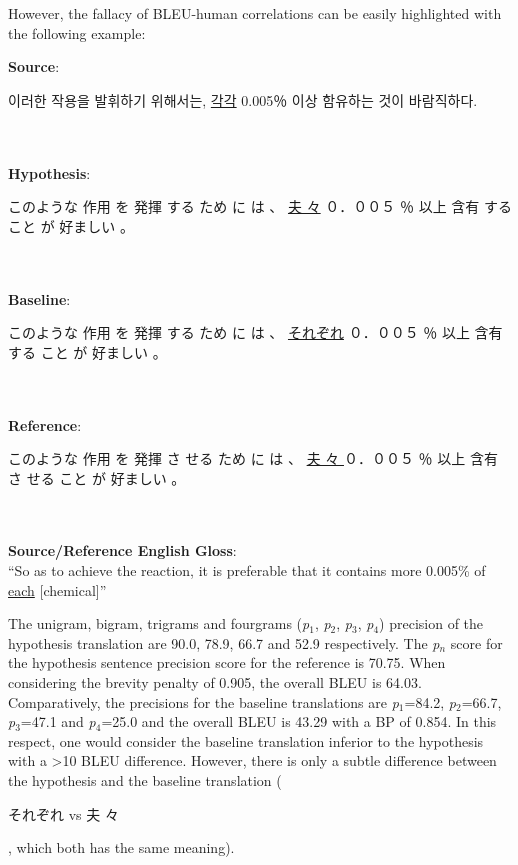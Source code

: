 However, the fallacy of BLEU-human correlations can be easily highlighted with the following example:

\newpage 
\noindent \textbf{Source}: \\
\begin{CJK*}{UTF8}{}\begin{korean}이러한 작용을 발휘하기 위해서는, \underline{각각} 0.005％ 이상 함유하는 것이 바람직하다. \end{korean}\end{CJK*}
\\ \\
\noindent \textbf{Hypothesis}:  \\
\begin{CJK*}{UTF8}{min}このような 作用 を 発揮 する ため に は 、 \underline{夫 々} ０．００５ ％ 以上 含有 する こと が 好ましい 。\end{CJK*}
\\ \\
\noindent \textbf{Baseline}:  \\
\begin{CJK*}{UTF8}{min}このような 作用 を 発揮 する ため に は 、 \underline{それぞれ} ０．００５ ％ 以上 含有 する こと が 好ましい 。\end{CJK*}
\\ \\
\noindent \textbf{Reference}: \\
\begin{CJK*}{UTF8}{min}このような 作用 を 発揮 さ せる ため に は 、 \underline{夫 々 } ０．００５ ％ 以上 含有 さ せる こと が 好ましい 。\end{CJK*}
\\ \\
\textbf{Source/Reference English Gloss}: \\
``So as to achieve the reaction, it is preferable that it contains more 0.005\% of \underline{each} [chemical]''
\vspace{5mm}

The unigram, bigram, trigrams and fourgrams (\emph{p$_1$}, \emph{p$_2$}, \emph{p$_3$}, \emph{p$_4$}) precision of the hypothesis translation are 90.0, 78.9, 66.7 and 52.9 respectively. The \emph{p$_n$} score for the hypothesis sentence precision score for the reference is 70.75. When considering the brevity penalty of 0.905, the overall BLEU is 64.03. Comparatively, the \ngram{} precisions for the baseline translations are \emph{p$_1$}=84.2, \emph{p$_2$}=66.7, \emph{p$_3$}=47.1 and \emph{p$_4$}=25.0 and the overall BLEU is 43.29 with a BP of 0.854. In this respect, one would consider the baseline translation inferior to the hypothesis with a \textgreater10 BLEU difference. However, there is only a subtle difference between the hypothesis and the baseline translation (\begin{CJK*}{UTF8}{min}それぞれ  vs 夫 々\end{CJK*}, which both has the same meaning).

